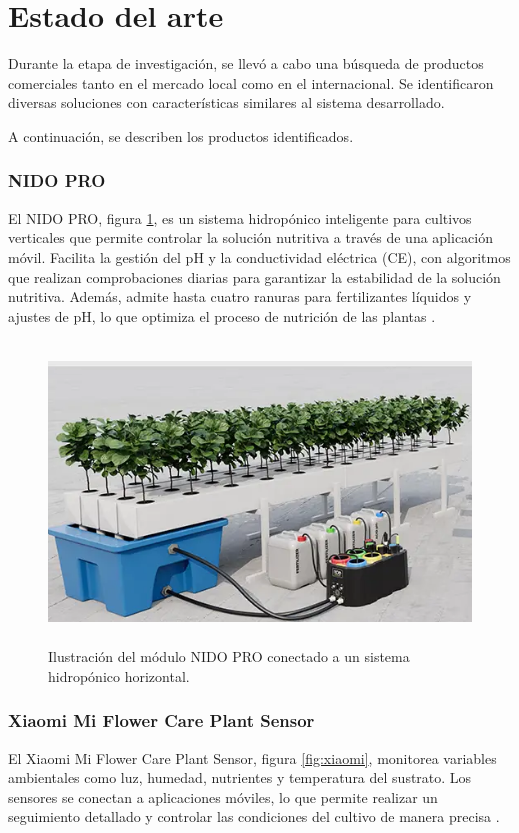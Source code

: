 \section{Estado del arte}
Durante la etapa de investigación, se llevó a cabo una búsqueda de productos comerciales tanto en el mercado local como en el internacional. Se identificaron diversas soluciones con características similares al sistema desarrollado.

A continuación, se describen los productos identificados.

\subsubsection{NIDO PRO}
El NIDO PRO, figura \ref{fig:nido_pro}, es un sistema hidropónico inteligente para cultivos verticales que permite controlar la solución nutritiva a través de una aplicación móvil. Facilita la gestión del pH y la conductividad eléctrica (CE), con algoritmos que realizan comprobaciones diarias para garantizar la estabilidad de la solución nutritiva. Además, admite hasta cuatro ranuras para fertilizantes líquidos y ajustes de pH, lo que optimiza el proceso de nutrición de las plantas \cite{NIDO:PRO}.

\begin{figure}[h]
	\centering
	\includegraphics[height=8cm]{./Figures/nido:pro.png}
	\caption{Ilustración del módulo NIDO PRO conectado a un sistema hidropónico horizontal.}
	\label{fig:nido_pro}
\end{figure}


\subsubsection{Xiaomi Mi Flower Care Plant Sensor}
El Xiaomi Mi Flower Care Plant Sensor, figura \ref{fig:xiaomi}, monitorea variables ambientales como luz, humedad, nutrientes y temperatura del sustrato. Los sensores se conectan a aplicaciones móviles, lo que permite realizar un seguimiento detallado y controlar las condiciones del cultivo de manera precisa \cite{XIAOMI}.

